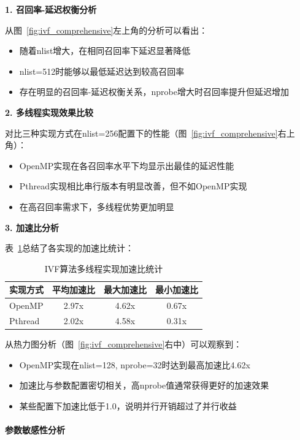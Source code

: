 \textbf{1. 召回率-延迟权衡分析}

从图~\ref{fig:ivf_comprehensive}左上角的分析可以看出：
\begin{itemize}
    \item 随着nlist增大，在相同召回率下延迟显著降低
    \item nlist=512时能够以最低延迟达到较高召回率
    \item 存在明显的召回率-延迟权衡关系，nprobe增大时召回率提升但延迟增加
\end{itemize}

\textbf{2. 多线程实现效果比较}

对比三种实现方式在nlist=256配置下的性能（图~\ref{fig:ivf_comprehensive}右上角）：
\begin{itemize}
    \item OpenMP实现在各召回率水平下均显示出最佳的延迟性能
    \item Pthread实现相比串行版本有明显改善，但不如OpenMP实现
    \item 在高召回率需求下，多线程优势更加明显
\end{itemize}

\textbf{3. 加速比分析}

表~\ref{tab:ivf_speedup_summary}总结了各实现的加速比统计：

\begin{table}[htbp]
    \centering
    \caption{IVF算法多线程实现加速比统计}
    \label{tab:ivf_speedup_summary}
    \begin{tabular}{lccc}
        \hline
        实现方式 & 平均加速比 & 最大加速比 & 最小加速比 \\
        \hline
        OpenMP & 2.97x & 4.62x & 0.67x \\
        Pthread & 2.02x & 4.58x & 0.31x \\
        \hline
    \end{tabular}
\end{table}

从热力图分析（图~\ref{fig:ivf_comprehensive}右中）可以观察到：
\begin{itemize}
    \item OpenMP实现在nlist=128, nprobe=32时达到最高加速比4.62x
    \item 加速比与参数配置密切相关，高nprobe值通常获得更好的加速效果
    \item 某些配置下加速比低于1.0，说明并行开销超过了并行收益
\end{itemize}

\paragraph{参数敏感性分析}

